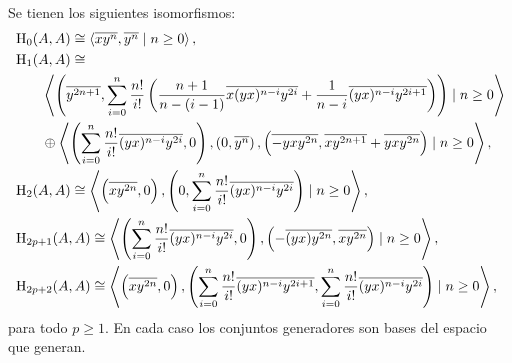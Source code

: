 \documentclass[fleqn,../tesis.tex]{subfiles}
\begin{document}
\begin{prop} Se tienen los siguientes isomorfismos:
\begin{align*}
    		&\operatorname{H}_0(A, A) \cong \left\langle \overline{xy^n}, \overline{y^n} \mid n \geq 0 \right\rangle, \\
    		&\operatorname{H}_1(A, A) \cong \\
    		    &\qquad\left\langle \left(\overline{y^{2n + 1}},
    			\sum_{i = 0}^n\frac{n!}{i!} \left(\frac{n + 1}{n -(i - 1)}\overline{x(yx)^{n - i}y^{2i}}
    				+ \frac{1}{n - i}\overline{(yx)^{n - i}y^{2i + 1}} \right) \right) \mid n \geq 0 \right\rangle\\
    			&\qquad\oplus \left\langle \left(\sum_{i = 0}^n\frac{n!}{i!}\overline{(yx)^{n - i}y^{2i}}, 0\right),
    				\left(0, \overline{y^{n}}\right), \left(\overline{-yxy^{2n}},\overline{xy^{2n + 1}} + \overline{yxy^{2n}}\right) \mid n \geq 0 \right\rangle, \\
    		&\operatorname{H}_2(A, A) \cong \left\langle \left(\overline{xy^{2n}}, 0\right), \left(0, \sum_{i = 0}^n\frac{n!}{i!}\overline{(yx)^{n - i}y^{2i}}\right) \mid n \geq 0 \right\rangle, \\
    		&\operatorname{H}_{2p + 1}(A, A) \cong \left\langle \left(\sum_{i = 0}^n\frac{n!}{i!}\overline{(yx)^{n - i}y^{2i}}, 0\right) ,
    			\left(-\overline{(yx)y^{2n}}, \overline{xy^{2n}}\right) \mid n \geq 0 \right\rangle, \\
    		&\operatorname{H}_{2p + 2}(A, A) \cong \left\langle \left(\overline{xy^{2n}}, 0 \right) ,
    			\left(\sum_{i = 0}^n\frac{n!}{i!}\overline{(yx)^{n - i}y^{2i + 1}}, \sum_{i = 0}^n\frac{n!}{i!}\overline{(yx)^{n - i}y^{2i}}\right)\mid
    				n \geq 0 \right\rangle, \\
    \end{align*}
    para todo $p \geq 1$. En cada caso los conjuntos generadores son bases del espacio que generan.
\end{prop}
\end{document}
